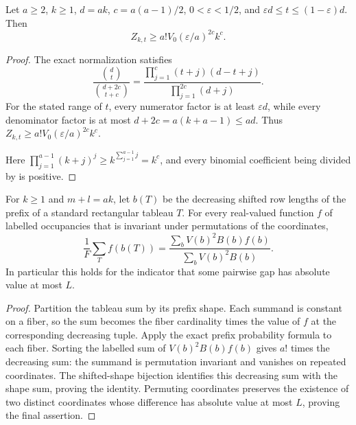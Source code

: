\begin{lemma}
\label{lem:prefix-normalizer-lower}
\leanok
Let $a\geq2$, $k\geq1$, $d=ak$, $c=a(a-1)/2$,
$0<\varepsilon<1/2$, and $\varepsilon d\leq t\leq(1-\varepsilon)d$.
Then
\[
 Z_{k,t}\geq a!V_0(\varepsilon/a)^{2c}k^c.
\]
\end{lemma}
\begin{proof}
The exact normalization satisfies
\[
 \frac{\binom dt}{\binom{d+2c}{t+c}}
 =\frac{\prod_{j=1}^c(t+j)(d-t+j)}{\prod_{j=1}^{2c}(d+j)}.
\]
For the stated range of $t$, every numerator factor is at least
$\varepsilon d$, while every denominator factor is at most
$d+2c=a(k+a-1)\leq ad$. Thus
$Z_{k,t}\geq a!V_0(\varepsilon/a)^{2c}k^c$.

Here $\prod_{j=1}^{a-1}(k+j)^j\geq k^{\sum_{j=1}^{a-1}j}=k^c$,
and every binomial coefficient being divided by is positive.
\end{proof}

\begin{lemma}
\label{lem:prefix-observables}
\leanok
For $k\geq1$ and $m+l=ak$, let $b(T)$ be the decreasing shifted
row lengths of the prefix of a standard rectangular tableau $T$.
For every real-valued function $f$ of labelled occupancies that is
invariant under permutations of the coordinates,
\[
 \frac{1}{F}\sum_T f(b(T))
 =\frac{\sum_b V(b)^2 B(b) f(b)}{\sum_b V(b)^2 B(b)}.
\]
In particular this holds for the indicator that some pairwise gap
has absolute value at most $L$.
\end{lemma}
\begin{proof}
Partition the tableau sum by its prefix shape. Each summand is constant
on a fiber, so the sum becomes the fiber cardinality times the value
of $f$ at the corresponding decreasing tuple. Apply the exact prefix
probability formula to each fiber. Sorting the labelled sum of
$V(b)^2B(b)f(b)$ gives $a!$ times the decreasing sum: the summand
is permutation invariant and vanishes on repeated coordinates.
The shifted-shape bijection identifies this decreasing sum with the
shape sum, proving the identity. Permuting coordinates preserves
the existence of two distinct coordinates whose difference has
absolute value at most $L$, proving the final assertion.
\end{proof}

